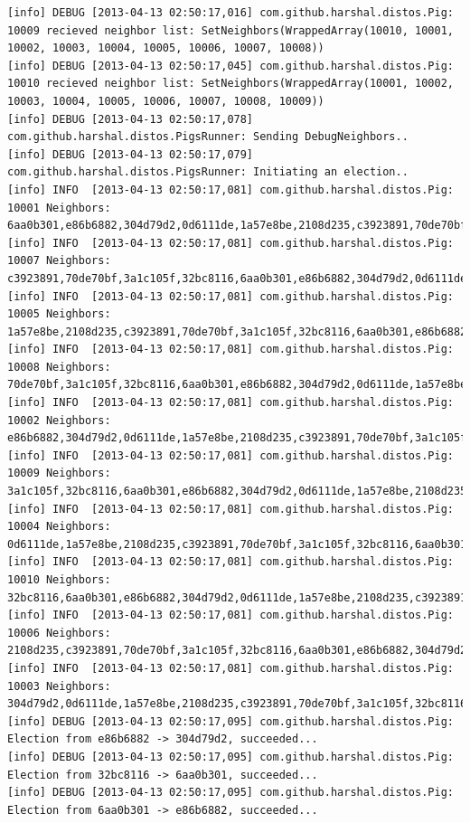 \documentclass[]{article}
\begin{document}
\begin{verbatim}
[info] DEBUG [2013-04-13 02:50:17,016] com.github.harshal.distos.Pig: 10009 recieved neighbor list: SetNeighbors(WrappedArray(10010, 10001, 10002, 10003, 10004, 10005, 10006, 10007, 10008))
[info] DEBUG [2013-04-13 02:50:17,045] com.github.harshal.distos.Pig: 10010 recieved neighbor list: SetNeighbors(WrappedArray(10001, 10002, 10003, 10004, 10005, 10006, 10007, 10008, 10009))
[info] DEBUG [2013-04-13 02:50:17,078] com.github.harshal.distos.PigsRunner: Sending DebugNeighbors..
[info] DEBUG [2013-04-13 02:50:17,079] com.github.harshal.distos.PigsRunner: Initiating an election..
[info] INFO  [2013-04-13 02:50:17,081] com.github.harshal.distos.Pig: 10001 Neighbors: 6aa0b301,e86b6882,304d79d2,0d6111de,1a57e8be,2108d235,c3923891,70de70bf,3a1c105f
[info] INFO  [2013-04-13 02:50:17,081] com.github.harshal.distos.Pig: 10007 Neighbors: c3923891,70de70bf,3a1c105f,32bc8116,6aa0b301,e86b6882,304d79d2,0d6111de,1a57e8be
[info] INFO  [2013-04-13 02:50:17,081] com.github.harshal.distos.Pig: 10005 Neighbors: 1a57e8be,2108d235,c3923891,70de70bf,3a1c105f,32bc8116,6aa0b301,e86b6882,304d79d2
[info] INFO  [2013-04-13 02:50:17,081] com.github.harshal.distos.Pig: 10008 Neighbors: 70de70bf,3a1c105f,32bc8116,6aa0b301,e86b6882,304d79d2,0d6111de,1a57e8be,2108d235
[info] INFO  [2013-04-13 02:50:17,081] com.github.harshal.distos.Pig: 10002 Neighbors: e86b6882,304d79d2,0d6111de,1a57e8be,2108d235,c3923891,70de70bf,3a1c105f,32bc8116
[info] INFO  [2013-04-13 02:50:17,081] com.github.harshal.distos.Pig: 10009 Neighbors: 3a1c105f,32bc8116,6aa0b301,e86b6882,304d79d2,0d6111de,1a57e8be,2108d235,c3923891
[info] INFO  [2013-04-13 02:50:17,081] com.github.harshal.distos.Pig: 10004 Neighbors: 0d6111de,1a57e8be,2108d235,c3923891,70de70bf,3a1c105f,32bc8116,6aa0b301,e86b6882
[info] INFO  [2013-04-13 02:50:17,081] com.github.harshal.distos.Pig: 10010 Neighbors: 32bc8116,6aa0b301,e86b6882,304d79d2,0d6111de,1a57e8be,2108d235,c3923891,70de70bf
[info] INFO  [2013-04-13 02:50:17,081] com.github.harshal.distos.Pig: 10006 Neighbors: 2108d235,c3923891,70de70bf,3a1c105f,32bc8116,6aa0b301,e86b6882,304d79d2,0d6111de
[info] INFO  [2013-04-13 02:50:17,081] com.github.harshal.distos.Pig: 10003 Neighbors: 304d79d2,0d6111de,1a57e8be,2108d235,c3923891,70de70bf,3a1c105f,32bc8116,6aa0b301
[info] DEBUG [2013-04-13 02:50:17,095] com.github.harshal.distos.Pig: Election from e86b6882 -> 304d79d2, succeeded...
[info] DEBUG [2013-04-13 02:50:17,095] com.github.harshal.distos.Pig: Election from 32bc8116 -> 6aa0b301, succeeded...
[info] DEBUG [2013-04-13 02:50:17,095] com.github.harshal.distos.Pig: Election from 6aa0b301 -> e86b6882, succeeded...

\end{verbatim}
\end{document}
